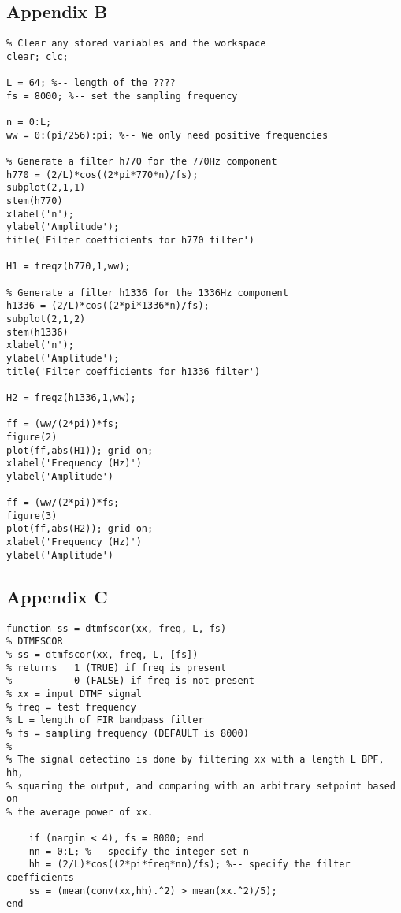 \documentclass{article}
\begin{document}
\newpage

\subsection{Appendix B}

\begin{lstlisting}
% Clear any stored variables and the workspace
clear; clc;

L = 64; %-- length of the ????
fs = 8000; %-- set the sampling frequency

n = 0:L;
ww = 0:(pi/256):pi; %-- We only need positive frequencies

% Generate a filter h770 for the 770Hz component
h770 = (2/L)*cos((2*pi*770*n)/fs);
subplot(2,1,1)
stem(h770)
xlabel('n');
ylabel('Amplitude');
title('Filter coefficients for h770 filter')

H1 = freqz(h770,1,ww);

% Generate a filter h1336 for the 1336Hz component
h1336 = (2/L)*cos((2*pi*1336*n)/fs);
subplot(2,1,2)
stem(h1336)
xlabel('n');
ylabel('Amplitude');
title('Filter coefficients for h1336 filter')

H2 = freqz(h1336,1,ww);

ff = (ww/(2*pi))*fs;
figure(2)
plot(ff,abs(H1)); grid on;
xlabel('Frequency (Hz)')
ylabel('Amplitude')

ff = (ww/(2*pi))*fs;
figure(3)
plot(ff,abs(H2)); grid on;
xlabel('Frequency (Hz)')
ylabel('Amplitude')
\end{lstlisting}

\newpage

\subsection{Appendix C}

\begin{lstlisting}
function ss = dtmfscor(xx, freq, L, fs)
% DTMFSCOR
% ss = dtmfscor(xx, freq, L, [fs])
% returns   1 (TRUE) if freq is present
%           0 (FALSE) if freq is not present
% xx = input DTMF signal
% freq = test frequency
% L = length of FIR bandpass filter
% fs = sampling frequency (DEFAULT is 8000)
%
% The signal detectino is done by filtering xx with a length L BPF, hh,
% squaring the output, and comparing with an arbitrary setpoint based on
% the average power of xx.

	if (nargin < 4), fs = 8000; end
	nn = 0:L; %-- specify the integer set n
	hh = (2/L)*cos((2*pi*freq*nn)/fs); %-- specify the filter coefficients 
	ss = (mean(conv(xx,hh).^2) > mean(xx.^2)/5);
end
\end{lstlisting}
\end{document}
